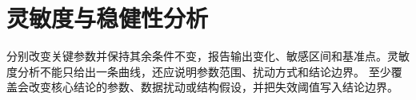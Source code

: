 \section{灵敏度与稳健性分析}
分别改变关键参数并保持其余条件不变，报告输出变化、敏感区间和基准点。灵敏度分析不能只给出一条曲线，还应说明参数范围、扰动方式和结论边界。
至少覆盖会改变核心结论的参数、数据扰动或结构假设，并把失效阈值写入结论边界。
